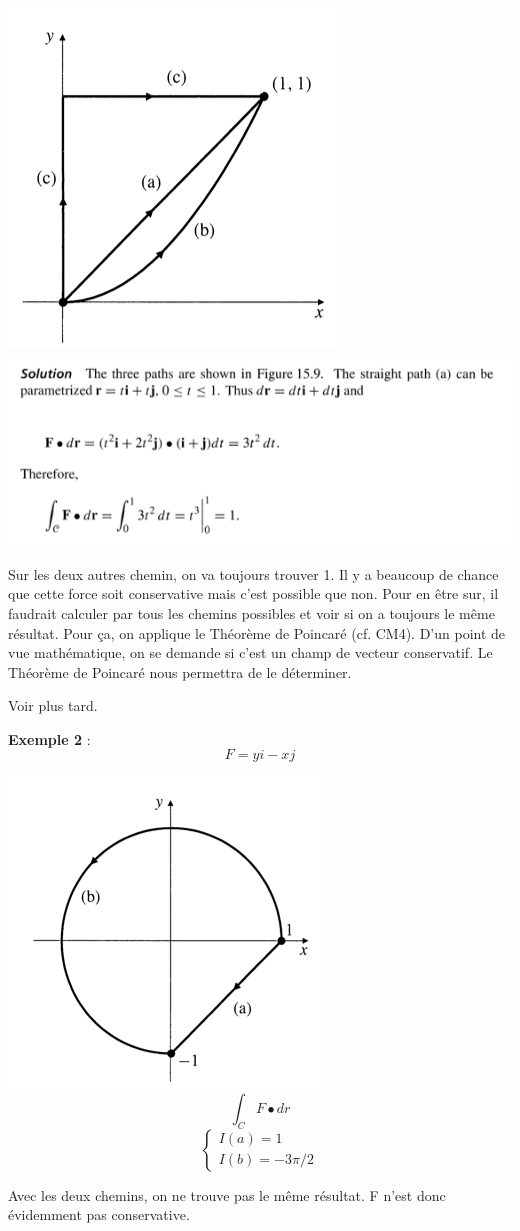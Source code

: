 \includegraphics[scale=0.6]{courbe3.png}\\
\includegraphics[scale=0.6]{resolu1.png}

Sur les deux autres chemin, on va toujours trouver 1. Il y a beaucoup de chance que cette force soit conservative mais c'est possible que non. Pour en être sur, il faudrait calculer par tous les chemins possibles et voir si on a toujours le même résultat. Pour ça, on applique le Théorème de Poincaré (cf. CM4). D'un point de vue mathématique, on se demande si c'est un champ de vecteur conservatif. Le Théorème de Poincaré nous permettra de le déterminer.

\begin{mytheo}
Voir plus tard.
\end{mytheo}
\textbf{Exemple 2 }: \[F=yi-xj\]

\includegraphics[scale=0.7]{resolu2.png}
\[\int_C F \bullet dr\]
$$\left\{
\begin{array}{l}
I(a)=1\\
I(b)=-3\pi/2
\end{array}
\right.
$$

Avec les deux chemins, on ne trouve pas le même résultat. F n'est donc évidemment pas conservative.
